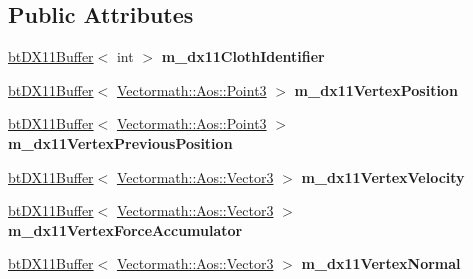 \subsection*{Public Attributes}
\begin{DoxyCompactItemize}
\item 
\mbox{\label{classbtSoftBodyVertexDataDX11_a10d8b77945f194d5c0b77a66dcdf6dee}} 
\hyperlink{classbtDX11Buffer}{bt\+D\+X11\+Buffer}$<$ int $>$ {\bfseries m\+\_\+dx11\+Cloth\+Identifier}
\item 
\mbox{\label{classbtSoftBodyVertexDataDX11_a2711adee0c9d3f47eef178985a147e4e}} 
\hyperlink{classbtDX11Buffer}{bt\+D\+X11\+Buffer}$<$ \hyperlink{classVectormath_1_1Aos_1_1Point3}{Vectormath\+::\+Aos\+::\+Point3} $>$ {\bfseries m\+\_\+dx11\+Vertex\+Position}
\item 
\mbox{\label{classbtSoftBodyVertexDataDX11_a202fbcbe182f4703e6d51a3725c16629}} 
\hyperlink{classbtDX11Buffer}{bt\+D\+X11\+Buffer}$<$ \hyperlink{classVectormath_1_1Aos_1_1Point3}{Vectormath\+::\+Aos\+::\+Point3} $>$ {\bfseries m\+\_\+dx11\+Vertex\+Previous\+Position}
\item 
\mbox{\label{classbtSoftBodyVertexDataDX11_a1709d7a0ddc122873b528ee67b8855f6}} 
\hyperlink{classbtDX11Buffer}{bt\+D\+X11\+Buffer}$<$ \hyperlink{classVectormath_1_1Aos_1_1Vector3}{Vectormath\+::\+Aos\+::\+Vector3} $>$ {\bfseries m\+\_\+dx11\+Vertex\+Velocity}
\item 
\mbox{\label{classbtSoftBodyVertexDataDX11_ad6e516cf0aed7249bd623c8d9c3e26b2}} 
\hyperlink{classbtDX11Buffer}{bt\+D\+X11\+Buffer}$<$ \hyperlink{classVectormath_1_1Aos_1_1Vector3}{Vectormath\+::\+Aos\+::\+Vector3} $>$ {\bfseries m\+\_\+dx11\+Vertex\+Force\+Accumulator}
\item 
\mbox{\label{classbtSoftBodyVertexDataDX11_ac39b7d4ddde0f1a74badbaefcd6e93e5}} 
\hyperlink{classbtDX11Buffer}{bt\+D\+X11\+Buffer}$<$ \hyperlink{classVectormath_1_1Aos_1_1Vector3}{Vectormath\+::\+Aos\+::\+Vector3} $>$ {\bfseries m\+\_\+dx11\+Vertex\+Normal}
\item 
\mbox{\label{classbtSoftBodyVertexDataDX11_a86a72e8bd49486ecb1bc2dcc87a0127c}} 

\end{DoxyCompactItemize}
